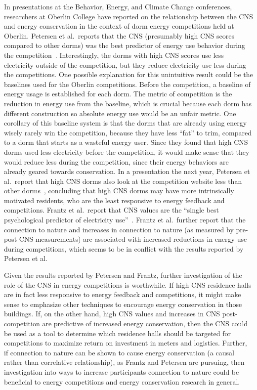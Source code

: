 In presentations at the Behavior, Energy, and Climate Change conferences, researchers at Oberlin College have reported on the relationship between the CNS and energy conservation in the context of dorm energy competitions held at Oberlin. Petersen et al.\ reports that the CNS (presumably high CNS scores compared to other dorms) was the best predictor of energy use behavior during the competition~\cite{Petersen2010}. Interestingly, the dorms with high CNS scores use less electricity outside of the competition, but they reduce electricity use less during the competitions. One possible explanation for this unintuitive result could be the baselines used for the Oberlin competitions. Before the competition, a baseline of energy usage is established for each dorm. The metric of competition is the reduction in energy use from the baseline, which is crucial because each dorm has different construction so absolute energy use would be an unfair metric. One corollary of this baseline system is that the dorms that are already using energy wisely rarely win the competition, because they have less ``fat'' to trim, compared to a dorm that starts as a wasteful energy user. Since they found that high CNS dorms used less electricity before the competition, it would make sense that they would reduce less during the competition, since their energy behaviors are already geared towards conservation. In a presentation the next year, Petersen et al.\ report that high CNS dorms also look at the competition website less than other dorms~\cite{Petersen2011}, concluding that high CNS dorms may have more intrinsically motivated residents, who are the least responsive to energy feedback and competitions. Frantz et al.\ report that CNS values are the ``single best psychological predictor of electricity use''~\cite{Frantz2011}. Frantz et al.\ further report that the connection to nature and increases in connection to nature (as measured by pre-post CNS measurements) are associated with increased reductions in energy use during competitions, which seems to be in conflict with the results reported by Petersen et al.

Given the results reported by Petersen and Frantz, further investigation of the role of the CNS in energy competitions is worthwhile. If high CNS residence halls are in fact less responsive to energy feedback and competitions, it might make sense to emphasize other techniques to encourage energy conservation in those buildings. If, on the other hand, high CNS values and increases in CNS post-competition are predictive of increased energy conservation, then the CNS could be used as a tool to determine which residence halls should be targeted for competitions to maximize return on investment in meters and logistics. Further, if connection to nature can be shown to cause energy conservation (a causal rather than correlative relationship), as Frantz and Petersen are pursuing, then investigation into ways to increase participants connection to nature could be beneficial to energy competitions and energy conservation research in general.


